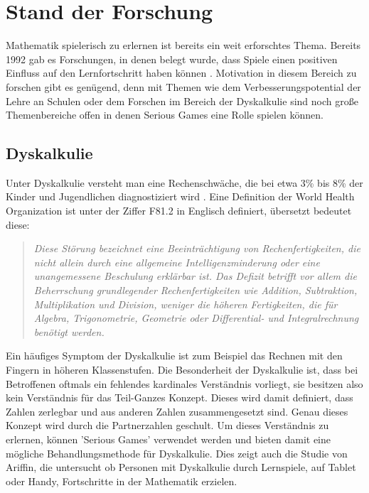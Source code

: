 
\chapter{Stand der Forschung}
Mathematik spielerisch zu erlernen ist bereits ein weit erforschtes Thema. Bereits 1992 gab es Forschungen, in denen belegt wurde, dass Spiele einen positiven Einfluss auf den Lernfortschritt haben können \cite{Randel1992}. Motivation in diesem Bereich zu forschen gibt es genügend, denn mit Themen wie dem Verbesserungspotential der Lehre an Schulen \cite{moeslein2018} oder dem Forschen im Bereich der Dyskalkulie \cite{wilms2015} sind noch große Themenbereiche offen in denen Serious Games eine Rolle spielen können.
\section{Dyskalkulie}
Unter Dyskalkulie versteht man eine Rechenschwäche, die bei etwa 3\% bis 8\% der Kinder und Jugendlichen diagnostiziert wird \cite{Dyskalkulie2018}. Eine Definition der World Health Organization\cite{who} ist unter der Ziffer F81.2 in Englisch definiert, übersetzt bedeutet diese:
\begin{quote}
\textit{ Diese Störung bezeichnet eine Beeinträchtigung von Rechenfertigkeiten, die nicht allein durch eine allgemeine Intelligenzminderung oder eine unangemessene Beschulung erklärbar ist. Das Defizit betrifft vor allem die Beherrschung grundlegender Rechenfertigkeiten wie Addition, Subtraktion, Multiplikation und Division, weniger die höheren Fertigkeiten, die für Algebra, Trigonometrie, Geometrie oder Differential- und Integralrechnung benötigt werden. }
\end{quote}
Ein häufiges Symptom der Dyskalkulie ist zum Beispiel das Rechnen mit den Fingern in höheren Klassenstufen. Die Besonderheit der Dyskalkulie ist, dass bei Betroffenen oftmals ein fehlendes kardinales Verständnis vorliegt\cite{fritz2009}, sie besitzen also kein Verständnis für das Teil-Ganzes Konzept. Dieses wird damit definiert, dass Zahlen zerlegbar und aus anderen Zahlen zusammengesetzt sind. Genau dieses Konzept wird durch die Partnerzahlen geschult. Um dieses Verständnis zu erlernen, können 'Serious Games' verwendet werden\cite{Sch2016} und bieten damit eine mögliche Behandlungsmethode für Dyskalkulie. Dies zeigt auch die Studie von Ariffin\cite{Ariffin2017}, die untersucht ob Personen mit Dyskalkulie durch Lernspiele, auf Tablet oder Handy, Fortschritte in der Mathematik erzielen.
